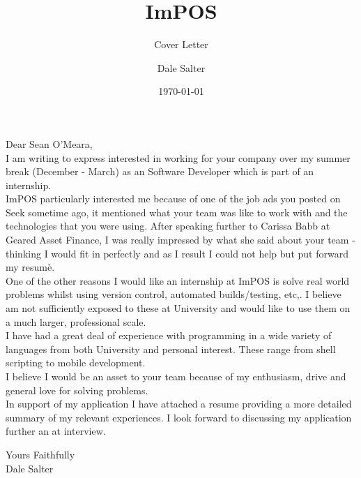 \documentclass[10pt]{scrartcl}
\title{ImPOS}
\subtitle{Cover Letter}
\author{Dale Salter}
\date{\today}
\begin{document}

\maketitle

\noindent Dear Sean O'Meara, \\

\noindent I am writing to express interested in working for your company over my summer break (December - March) as an Software Developer which is part of an internship. \\

\noindent ImPOS particularly interested me because of one of the job ads you posted on Seek sometime ago, it mentioned what your team was like to work with
            and the technologies that you were using. After speaking further to Carissa Babb at Geared Asset Finance, I was really impressed by what she said about your team - thinking I would fit in perfectly and as I result I could not help but put forward my resumè. \\

\noindent One of the other reasons I would like an internship at ImPOS is solve real world problems whilst using version control, automated builds/testing, etc,.
            I believe am not sufficiently exposed to these at University and would like to use them on a much larger, professional scale. \\

\noindent I have had a great deal of experience with programming in a wide variety of languages from both University and personal interest.
            These range from shell scripting to mobile development. \\

\noindent I believe I would be an asset to your team because of my enthusiasm, drive and general love for solving problems. \\

\noindent In support of my application I have attached a resume providing a more detailed summary of my relevant experiences. I look forward to discussing my application
            further an at interview.

\vspace{10 mm}

\noindent Yours Faithfully \\

\noindent Dale Salter
\end{document}
